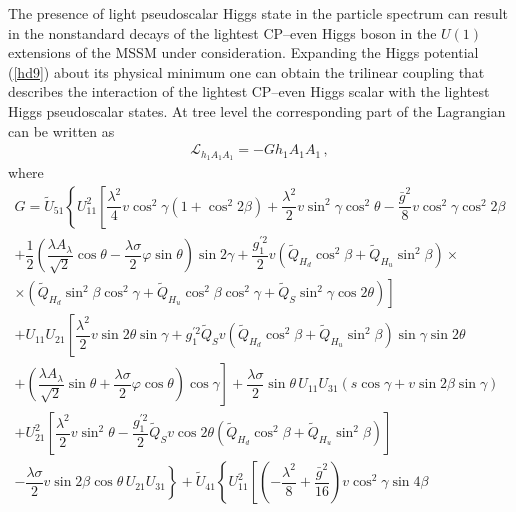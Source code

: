 \documentclass[12pt,a4paper]{article}
\begin{document}
The presence of light pseudoscalar Higgs state in the particle spectrum can result in the nonstandard decays of the lightest
CP--even Higgs boson in the $U(1)$ extensions of the MSSM under consideration. Expanding
the Higgs potential  (\ref{hd9}) about its physical minimum one can obtain the trilinear coupling that describes the interaction
of the lightest CP--even Higgs scalar with the lightest Higgs pseudoscalar states. At
 tree level the corresponding part
of the Lagrangian can be written as
\begin{equation}
\begin{array}{l}
\mathcal{L}_{h_1 A_1 A_1}=-G h_1 A_1 A_1\,,
\end{array}
\label{hd29}
\end{equation}
where
\begin{equation}
\begin{array}{l}
G=\tilde{U}_{51}\left\{U_{11}^2 \left[\dfrac{\lambda^2}{4}v\cos^2\gamma (1+\cos^2 2\beta) + \dfrac{\lambda^2}{2} v \sin^2 \gamma \cos^2 \theta
-\dfrac{\bar{g}^2}{8} v \cos^2 \gamma \cos^2 2\beta \right.\right.\\[1mm]
\left.\left.+\dfrac{1}{2}\left(\dfrac{\lambda A_{\lambda}}{\sqrt{2}} \cos\theta -
\dfrac{\lambda \sigma}{2} \varphi \sin\theta\right)\sin 2\gamma+
\dfrac{g_1^{'2}}{2}v\left(\tilde{Q}_{H_d}\cos^2\beta+\tilde{Q}_{H_u}\sin^2\beta\right)\times\right.\right.\\[1mm]
\left.\left.\times\left(\tilde{Q}_{H_d}\sin^2\beta \cos^2\gamma +
\tilde{Q}_{H_u}\cos^2\beta \cos^2\gamma +\tilde{Q}_{S}\sin^2\gamma \cos 2\theta\right)\right]\right.\\[1mm]
\left.+ U_{11} U_{21} \left[\dfrac{\lambda^2}{2} v \sin 2\theta \sin \gamma + g_1^{'2} \tilde{Q}_S v \left(\tilde{Q}_{H_d}\cos^2\beta
+\tilde{Q}_{H_u}\sin^2\beta\right) \sin\gamma \sin 2\theta \right.\right.\\[1mm]
\left.\left. + \left(\dfrac{\lambda A_{\lambda}}{\sqrt{2}}\sin\theta + \dfrac{\lambda \sigma}{2} \varphi \cos\theta\right) \cos\gamma\right]
+ \dfrac{\lambda\sigma}{2} \sin\theta\, U_{11} U_{31} (s\cos\gamma + v \sin 2\beta \sin\gamma)\right.\\[1mm]
\left. + U_{21}^2\left[\dfrac{\lambda^2}{2}v\sin^2\theta - \dfrac{g_1^{'2}}{2} \tilde{Q}_S v \cos 2\theta
\left(\tilde{Q}_{H_d}\cos^2\beta+\tilde{Q}_{H_u}\sin^2\beta\right)\right] \right.\\[1mm]
\left.- \dfrac{\lambda\sigma}{2} v \sin 2\beta \cos\theta\, U_{21} U_{31} \right\}
+\tilde{U}_{41}\left\{U_{11}^2 \left[\left(-\dfrac{\lambda^2}{8}+\dfrac{\bar{g}^2}{16}\right)v\cos^2\gamma \sin 4\beta\right.\right.\\[1mm]

\end{array}
\end{equation}
\end{document}
